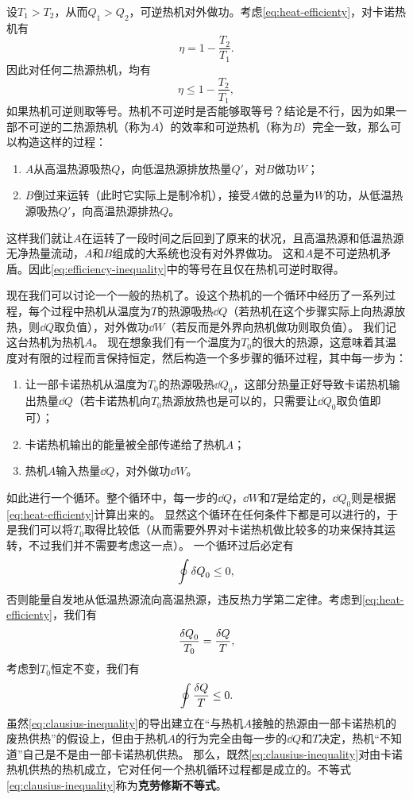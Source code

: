 \documentclass[hyperref, UTF8, a4paper]{ctexart}
\begin{document}
设$T_1>T_2$，从而$Q_1>Q_2$，可逆热机对外做功。考虑\eqref{eq:heat-efficienty}，对卡诺热机有
\begin{equation}
    \eta = 1 - \frac{T_2}{T_1}.
\end{equation}
因此对任何二热源热机，均有
\begin{equation}
    \eta \leq 1 - \frac{T_2}{T_1},
    \label{eq:efficiency-inequality}
\end{equation}
如果热机可逆则取等号。热机不可逆时是否能够取等号？结论是不行，因为如果一部不可逆的二热源热机（称为$A$）的效率和可逆热机（称为$B$）完全一致，那么可以构造这样的过程：
\begin{enumerate}
    \item $A$从高温热源吸热$Q$，向低温热源排放热量$Q'$，对$B$做功$W$；
    \item $B$倒过来运转（此时它实际上是制冷机），接受$A$做的总量为$W$的功，从低温热源吸热$Q'$，向高温热源排热$Q$。
\end{enumerate}
这样我们就让$A$在运转了一段时间之后回到了原来的状况，且高温热源和低温热源无净热量流动，$A$和$B$组成的大系统也没有对外界做功。
这和$A$是不可逆热机矛盾。因此\eqref{eq:efficiency-inequality}中的等号在且仅在热机可逆时取得。

现在我们可以讨论一个一般的热机了。设这个热机的一个循环中经历了一系列过程，每个过程中热机从温度为$T$的热源吸热$\dd{Q}$（若热机在这个步骤实际上向热源放热，则$\dd{Q}$取负值），对外做功$\dd{W}$（若反而是外界向热机做功则取负值）。
我们记这台热机为热机$A$。
现在想象我们有一个温度为$T_0$的很大的热源，这意味着其温度对有限的过程而言保持恒定，然后构造一个多步骤的循环过程，其中每一步为：
\begin{enumerate}
    \item 让一部卡诺热机从温度为$T_0$的热源吸热$\dd{Q}_0$，这部分热量正好导致卡诺热机输出热量$\dd{Q}$（若卡诺热机向$T_0$热源放热也是可以的，只需要让$\dd{Q}_0$取负值即可）；
    \item 卡诺热机输出的能量被全部传递给了热机$A$；
    \item 热机$A$输入热量$\dd{Q}$，对外做功$\dd{W}$。
\end{enumerate}
如此进行一个循环。整个循环中，每一步的$\dd{Q}$，$\dd{W}$和$T$是给定的，$\dd{Q}_0$则是根据\eqref{eq:heat-efficienty}计算出来的。
显然这个循环在任何条件下都是可以进行的，于是我们可以将$T_0$取得比较低（从而需要外界对卡诺热机做比较多的功来保持其运转，不过我们并不需要考虑这一点）。
一个循环过后必定有
\[
    \oint \var{Q}_0 \leq 0,
\]
否则能量自发地从低温热源流向高温热源，违反热力学第二定律。考虑到\eqref{eq:heat-efficienty}，我们有
\[
    \frac{\var{Q}_0}{T_0} = \frac{\var{Q}}{T},
\]
考虑到$T_0$恒定不变，我们有
\begin{equation}
    \oint \frac{\var{Q}}{T} \leq 0.
    \label{eq:clausius-inequality}
\end{equation}
虽然\eqref{eq:clausius-inequality}的导出建立在“与热机$A$接触的热源由一部卡诺热机的废热供热”的假设上，但由于热机$A$的行为完全由每一步的$\dd{Q}$和$T$决定，热机“不知道”自己是不是由一部卡诺热机供热。
那么，既然\eqref{eq:clausius-inequality}对由卡诺热机供热的热机成立，它对任何一个热机循环过程都是成立的。不等式\eqref{eq:clausius-inequality}称为\textbf{克劳修斯不等式}。
\end{document}
